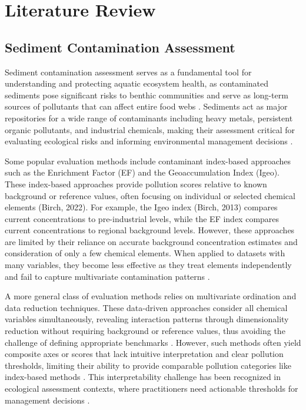 \section{Literature Review}

\subsection{Sediment Contamination Assessment}

Sediment contamination assessment serves as a fundamental tool for understanding
and protecting aquatic ecosystem health, as contaminated sediments pose significant
risks to benthic communities and serve as long-term sources of pollutants 
that can affect entire food webs
\cite{MacDonald2000SedimentGuidelines, Burton2010MultipleStressors}.
Sediments act as major repositories for a wide range of contaminants 
including heavy metals, persistent organic pollutants, and industrial
chemicals, making their assessment critical for evaluating ecological 
risks and informing environmental management decisions
\cite{Chapman1990SedimentTriad, USGS_SedimentAssociatedContaminants_2019}.

Some popular evaluation methods include contaminant index-based approaches such as the Enrichment Factor (EF) and the
Geoaccumulation Index (Igeo).
These index-based approaches provide pollution scores relative to known background or reference values, 
often focusing on individual or selected chemical elements \cite{Birch2022Review} (Birch, 2022). 
For example, the Igeo index \cite{BIRCH2013282} (Birch, 2013) compares current concentrations to pre-industrial levels,
while the EF index compares current concentrations to regional background levels.
However, these approaches are limited by their reliance on accurate background 
concentration estimates and consideration of only a few chemical elements. 
When applied to datasets with many variables, they become less effective 
as they treat elements independently and fail to capture multivariate 
contamination patterns \cite{Grunfeld2005Outliers}.

A more general class of evaluation methods relies on multivariate ordination and data reduction techniques. 
These data-driven approaches consider all chemical variables simultaneously, revealing interaction patterns 
through dimensionality reduction without requiring background or reference values, thus avoiding the 
challenge of defining appropriate benchmarks \cite{Ciborowski2005ZoobenthicIndicators, Reynoldson1997ReferenceCondition}. 
However, such methods often yield composite axes or scores that lack intuitive interpretation and clear 
pollution thresholds, limiting their ability to provide comparable pollution categories like index-based 
methods \cite{Reimann2008Chemometrics}. This interpretability challenge has been recognized in ecological 
assessment contexts, where practitioners need actionable thresholds for management decisions 
\cite{Reynoldson1999RCA}.

